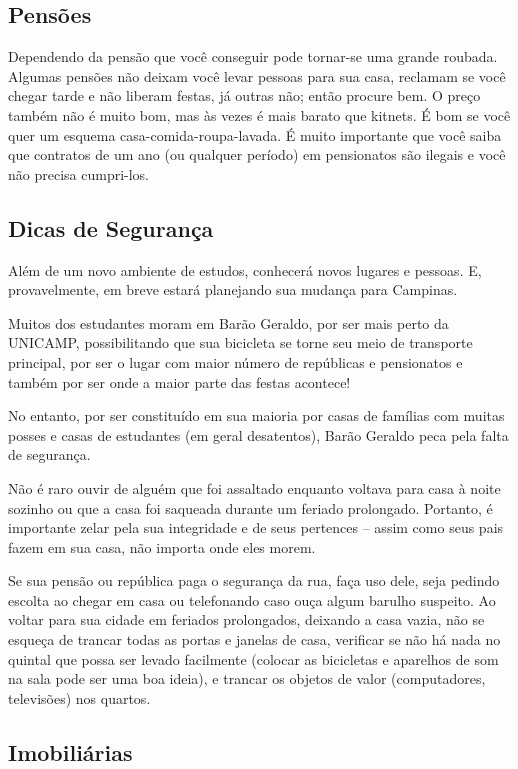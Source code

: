 \subsection{Pensões}

Dependendo da pensão que você conseguir pode tornar-se uma grande roubada.
Algumas pensões não deixam você levar pessoas para sua casa, reclamam se você
chegar tarde e não liberam festas, já outras não; então procure bem. O preço
também não é muito bom, mas às vezes é mais barato que kitnets. É bom se você
quer um esquema casa-comida-roupa-lavada. É muito importante que você saiba que
contratos de um ano (ou qualquer período) em pensionatos são ilegais e você não
precisa cumpri-los.

\subsection{Dicas de Segurança}

Além de um novo ambiente de estudos, conhecerá novos lugares e pessoas. E,
provavelmente, em breve estará planejando sua mudança para Campinas.

Muitos dos estudantes moram em Barão Geraldo, por ser mais perto da UNICAMP,
possibilitando que sua bicicleta se torne seu meio de transporte principal, por
ser o lugar com maior número de repúblicas e pensionatos e também por ser onde
a maior parte das festas acontece!

No entanto, por ser constituído em sua maioria por casas de famílias com muitas
posses e casas de estudantes (em geral desatentos), Barão Geraldo peca pela
falta de segurança.

Não é raro ouvir de alguém que foi assaltado enquanto voltava para casa à noite
sozinho ou que a casa foi saqueada durante um feriado prolongado. Portanto,
é importante zelar pela sua integridade e de seus pertences -- assim como seus
pais fazem em sua casa, não importa onde eles morem.

Se sua pensão ou república paga o segurança da rua, faça uso dele, seja pedindo
escolta ao chegar em casa ou telefonando caso ouça algum barulho suspeito. Ao
voltar para sua cidade em feriados prolongados, deixando a casa vazia, não se
esqueça de trancar todas as portas e janelas de casa, verificar se não há nada
no quintal que possa ser levado facilmente (colocar as bicicletas e aparelhos de
som na sala pode ser uma boa ideia), e trancar os objetos de valor
(computadores, televisões) nos quartos.

\subsection{Imobiliárias}

